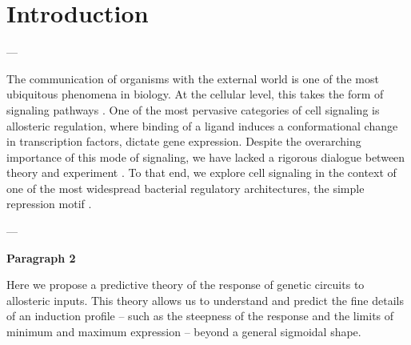 \section*{Introduction}


---


The communication of organisms with the external world is one of the most
ubiquitous phenomena in biology. At the cellular level, this takes the form of
 signaling pathways . One of the most
pervasive categories  of cell signaling is
allosteric regulation, where binding of a ligand induces a conformational change
in transcription factors, dictate gene expression. Despite the overarching
importance of this mode of signaling, we have lacked a rigorous dialogue between
theory and experiment \cite{Lindsley2006}. To that end, we explore cell
signaling in the context of one of the most widespread bacterial regulatory
architectures, the simple repression motif \cite{Rydenfelt2014}.


---

\textbf{Paragraph 2}

Here we propose a predictive theory of the response of genetic circuits to
allosteric inputs. This theory allows us to understand and predict the fine
details of an induction profile -- such as the steepness of the response and
the limits of minimum and maximum expression -- beyond a general sigmoidal
shape.

